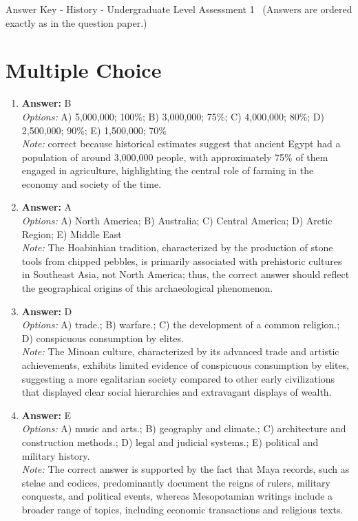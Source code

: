 \documentclass[12pt]{article}
\begin{document}
\begin{center}
Answer Key - History - Undergraduate Level Assessment 1 \
\small (Answers are ordered exactly as in the question paper.)
\end{center}

\section*{Multiple Choice}
\begin{enumerate}[label=\arabic*.]
\item \textbf{Answer:} B
\\ \textit{Options:} A) 5,000,000; 100\%; B) 3,000,000; 75\%; C) 4,000,000; 80\%; D) 2,500,000; 90\%; E) 1,500,000; 70\%
\\ \textit{Note:} correct because historical estimates suggest that ancient Egypt had a population of around 3,000,000 people, with approximately 75\% of them engaged in agriculture, highlighting the central role of farming in the economy and society of the time.
\item \textbf{Answer:} A
\\ \textit{Options:} A) North America; B) Australia; C) Central America; D) Arctic Region; E) Middle East
\\ \textit{Note:} The Hoabinhian tradition, characterized by the production of stone tools from chipped pebbles, is primarily associated with prehistoric cultures in Southeast Asia, not North America; thus, the correct answer should reflect the geographical origins of this archaeological phenomenon.
\item \textbf{Answer:} D
\\ \textit{Options:} A) trade.; B) warfare.; C) the development of a common religion.; D) conspicuous consumption by elites.
\\ \textit{Note:} The Minoan culture, characterized by its advanced trade and artistic achievements, exhibits limited evidence of conspicuous consumption by elites, suggesting a more egalitarian society compared to other early civilizations that displayed clear social hierarchies and extravagant displays of wealth.
\item \textbf{Answer:} E
\\ \textit{Options:} A) music and arts.; B) geography and climate.; C) architecture and construction methods.; D) legal and judicial systems.; E) political and military history.
\\ \textit{Note:} The correct answer is supported by the fact that Maya records, such as stelae and codices, predominantly document the reigns of rulers, military conquests, and political events, whereas Mesopotamian writings include a broader range of topics, including economic transactions and religious texts.

\end{enumerate}
\end{document}
